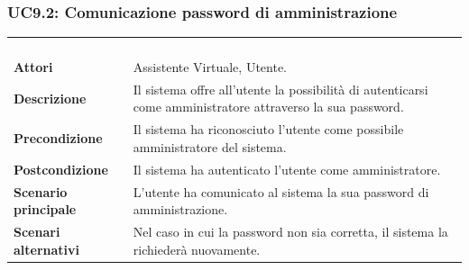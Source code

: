 \subsubsection{UC9.2: Comunicazione password di amministrazione}
\label{UC9.2}
\begin{longtable}{l|p{10cm}}
\rowcolor[gray]{0.8} \multicolumn{2}{c}{} \\
\rowcolor[gray]{0.8} \multicolumn{2}{c}{\textbf{UC9.2 - Comunicazione password di amministrazione}} \\
\rowcolor[gray]{0.8} \multicolumn{2}{c}{} \\
\hline
&\\
\textbf{Attori} & Assistente Virtuale, Utente.\\[7pt]
\textbf{Descrizione} & Il sistema offre all'utente la possibilità di autenticarsi come amministratore attraverso la sua password.\\[7pt]
\textbf{Precondizione} & Il sistema ha riconosciuto l'utente come possibile amministratore del sistema.\\[7pt]
\textbf{Postcondizione} & Il sistema ha autenticato l'utente come amministratore.\\[7pt]
\textbf{Scenario principale} &L'utente ha comunicato al sistema la sua password di amministrazione.\\[7pt]
\textbf{Scenari alternativi} & Nel caso in cui la password non sia corretta, il sistema la richiederà nuovamente.\\[7pt]\hline
\end{longtable}

